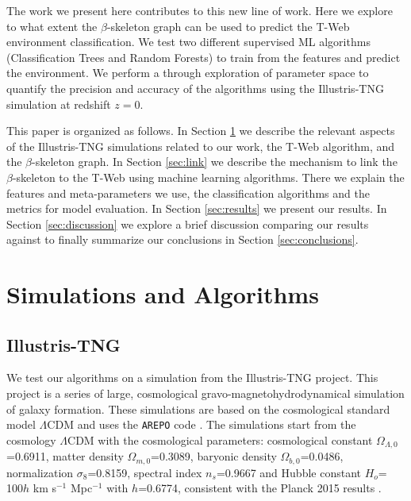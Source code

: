 \documentclass[usenatbib]{mnras}
\begin{document}
The work we present here contributes to this new line of work.
Here we explore to what extent the $\beta$-skeleton graph \citep{Fang2019} can be used to predict the T-Web \citep{Forero-Romero2009} environment classification.
We test two different supervised ML
algorithms (Classification Trees and Random Forests) 
to train from the features and predict the environment.
We perform a through exploration of parameter space to quantify the precision and accuracy of the algorithms using the Illustris-TNG simulation \citep{Nelson2019} at redshift $z=0$.

This paper is organized as follows. 
In Section \ref{sec:init} we describe the relevant aspects of the Illustris-TNG
simulations related to our work, the T-Web algorithm,
and the $\beta$-skeleton graph.
In Section \ref{sec:link} we describe the mechanism to link the
$\beta$-skeleton to the T-Web using machine learning algorithms.
There we explain the features and meta-parameters we use, the
classification algorithms and the metrics for model evaluation.  
In Section \ref{sec:results} we present our results. In Section \ref{sec:discussion} we explore a brief discussion comparing our results against \citep{Tsizh2019} to finally summarize our conclusions in Section \ref{sec:conclusions}.

\section{Simulations and Algorithms}\label{sec:init}

\subsection{Illustris-TNG}

We test our algorithms on a simulation from the Illustris-TNG project.
This project \citep{Nelson2019} is a series of large,
cosmological gravo-magnetohydrodynamical simulation of galaxy formation. 
These simulations are based on the cosmological standard model
$\Lambda$CDM and uses the \texttt{AREPO} code \citep{Springel2011}.
The simulations start from the cosmology $\Lambda$CDM with the
cosmological parameters: cosmological constant
$\Omega_{\Lambda,0}$=0.6911, matter density $\Omega_{m,0}$=0.3089,
baryonic density $\Omega_{b,0}$=0.0486, normalization
$\sigma_8$=0.8159, spectral index $n_s$=0.9667 and Hubble constant
$H_o$= 100$h$ km s$^{-1}$ Mpc$^{-1}$ with $h$=0.6774, consistent with
the Planck 2015 results \citep{Ade2016}.  
\end{document}
